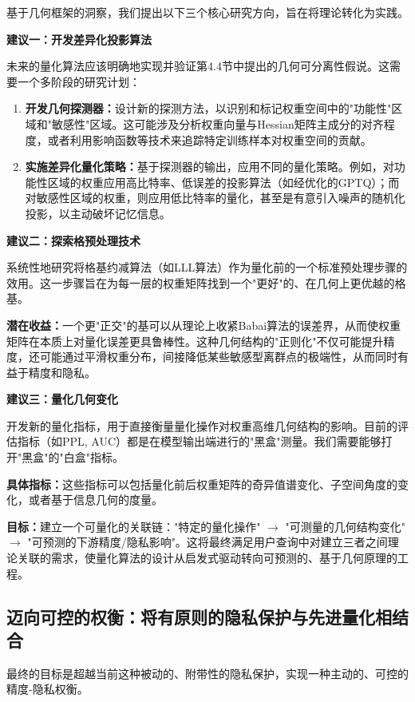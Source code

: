 \documentclass[letterpaper,twocolumn,10pt]{article}
\begin{document}
基于几何框架的洞察，我们提出以下三个核心研究方向，旨在将理论转化为实践。

\textbf{建议一：开发差异化投影算法}

未来的量化算法应该明确地实现并验证第4.4节中提出的几何可分离性假说。这需要一个多阶段的研究计划：

\begin{enumerate}
\item \textbf{开发几何探测器：}设计新的探测方法，以识别和标记权重空间中的"功能性"区域和"敏感性"区域。这可能涉及分析权重向量与Hessian矩阵主成分的对齐程度，或者利用影响函数等技术来追踪特定训练样本对权重空间的贡献。
\item \textbf{实施差异化量化策略：}基于探测器的输出，应用不同的量化策略。例如，对功能性区域的权重应用高比特率、低误差的投影算法（如经优化的GPTQ）；而对敏感性区域的权重，则应用低比特率的量化，甚至是有意引入噪声的随机化投影，以主动破坏记忆信息。
\end{enumerate}

\textbf{建议二：探索格预处理技术}

系统性地研究将格基约减算法（如LLL算法）作为量化前的一个标准预处理步骤的效用。这一步骤旨在为每一层的权重矩阵找到一个"更好"的、在几何上更优越的格基。

\textbf{潜在收益：}一个更"正交"的基可以从理论上收紧Babai算法的误差界，从而使权重矩阵在本质上对量化误差更具鲁棒性。这种几何结构的"正则化"不仅可能提升精度，还可能通过平滑权重分布，间接降低某些敏感型离群点的极端性，从而同时有益于精度和隐私。

\textbf{建议三：量化几何变化}

开发新的量化指标，用于直接衡量量化操作对权重高维几何结构的影响。目前的评估指标（如PPL, AUC）都是在模型输出端进行的"黑盒"测量。我们需要能够打开"黑盒"的"白盒"指标。

\textbf{具体指标：}这些指标可以包括量化前后权重矩阵的奇异值谱变化、子空间角度的变化，或者基于信息几何的度量。

\textbf{目标：}建立一个可量化的关联链："特定的量化操作" $\rightarrow$ "可测量的几何结构变化" $\rightarrow$ "可预测的下游精度/隐私影响"。这将最终满足用户查询中对建立三者之间理论关联的需求，使量化算法的设计从启发式驱动转向可预测的、基于几何原理的工程。

\subsection{迈向可控的权衡：将有原则的隐私保护与先进量化相结合}

最终的目标是超越当前这种被动的、附带性的隐私保护，实现一种主动的、可控的精度-隐私权衡。
\end{document}
